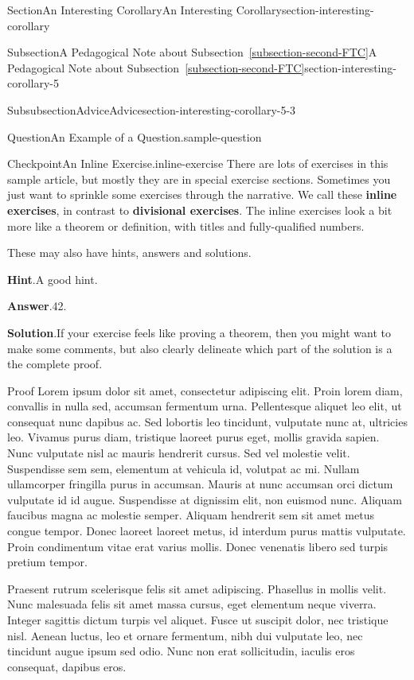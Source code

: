 \documentclass[twoside,10pt,]{article}
\newcommand{\blocktitlefont}{\relax}
\newcommand{\xreffont}{\relax}
\newcommand{\terminology}[1]{\textbf{#1}}
\numberwithin{equation}{section}
\begin{document}
\begin{sectionptx}{Section}{An Interesting Corollary}{}{An Interesting Corollary}{}{}{section-interesting-corollary}
\begin{subsectionptx}{Subsection}{A Pedagogical Note about Subsection~{\xreffont\ref*{subsection-second-FTC}}}{}{A Pedagogical Note about Subsection~{\xreffont\ref*{subsection-second-FTC}}}{}{}{section-interesting-corollary-5}
\begin{subsubsectionptx}{Subsubsection}{Advice}{}{Advice}{}{}{section-interesting-corollary-5-3}
\begin{question}{Question}{An Example of a Question.}{sample-question}
\end{question}
\begin{inlineexercise}{Checkpoint}{An Inline Exercise.}{inline-exercise}%
There are lots of exercises in this sample article, but mostly they are in special exercise sections.  Sometimes you just want to sprinkle some exercises through the narrative.  We call these \terminology{inline exercises}, in contrast to \terminology{divisional exercises}.  The inline exercises look a bit more like a theorem or definition, with titles and fully-qualified numbers.%
\par
These may also have hints, answers and solutions.%
\par\smallskip%
\noindent\textbf{\blocktitlefont Hint}.\hypertarget{inline-exercise-3}{}\quad{}A good hint.%
\par\smallskip%
\noindent\textbf{\blocktitlefont Answer}.\hypertarget{inline-exercise-4}{}\quad{}42.%
\par\smallskip%
\noindent\textbf{\blocktitlefont Solution}.\hypertarget{inline-exercise-5}{}\quad{}If your exercise feels like proving a theorem, then you might want to make some comments, but also clearly delineate which part of the solution is a the complete proof.%
\begin{solutionproof}{Proof}
Lorem ipsum dolor sit amet, consectetur adipiscing elit. Proin lorem diam, convallis in nulla sed, accumsan fermentum urna. Pellentesque aliquet leo elit, ut consequat nunc dapibus ac. Sed lobortis leo tincidunt, vulputate nunc at, ultricies leo. Vivamus purus diam, tristique laoreet purus eget, mollis gravida sapien. Nunc vulputate nisl ac mauris hendrerit cursus. Sed vel molestie velit. Suspendisse sem sem, elementum at vehicula id, volutpat ac mi. Nullam ullamcorper fringilla purus in accumsan. Mauris at nunc accumsan orci dictum vulputate id id augue. Suspendisse at dignissim elit, non euismod nunc. Aliquam faucibus magna ac molestie semper. Aliquam hendrerit sem sit amet metus congue tempor. Donec laoreet laoreet metus, id interdum purus mattis vulputate. Proin condimentum vitae erat varius mollis. Donec venenatis libero sed turpis pretium tempor.%
\par
Praesent rutrum scelerisque felis sit amet adipiscing. Phasellus in mollis velit. Nunc malesuada felis sit amet massa cursus, eget elementum neque viverra. Integer sagittis dictum turpis vel aliquet. Fusce ut suscipit dolor, nec tristique nisl. Aenean luctus, leo et ornare fermentum, nibh dui vulputate leo, nec tincidunt augue ipsum sed odio. Nunc non erat sollicitudin, iaculis eros consequat, dapibus eros.%

\end{solutionproof}
\end{inlineexercise}
\end{subsubsectionptx}
\end{subsectionptx}
\end{sectionptx}
\end{document}
